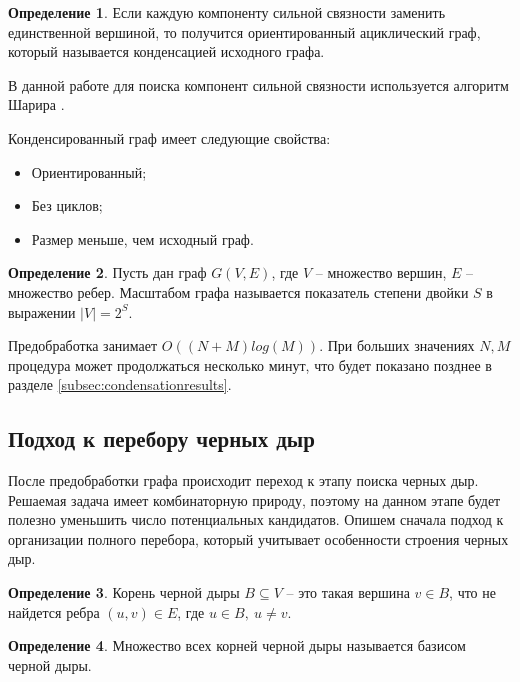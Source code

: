 \documentclass[12pt,a4paper,oneside,openany]{article}
\theoremstyle{definition}
\newtheorem{definition}{Определение}[]
\theoremstyle{lemma}
\theoremstyle{remark}
\begin{document}
\begin{definition}\label{def:condensation}
Если каждую компоненту сильной связности заменить единственной вершиной, то получится ориентированный ациклический граф, который называется конденсацией исходного графа.
\end{definition}

В данной работе для поиска компонент сильной связности используется алгоритм Шарира \cite{sharir1981strong}.

Конденсированный граф имеет следующие свойства:
    \begin{itemize}
        \item Ориентированный;
        \item Без циклов;
        \item Размер меньше, чем исходный граф.
    \end{itemize}

\begin{definition}
    Пусть дан граф $G(V,E)$, где $V$ -- множество вершин, $E$ -- множество ребер. Масштабом графа называется показатель степени двойки $S$ в выражении $|V| = 2^{S}$.
\end{definition}

Предобработка занимает $O((N+M)log(M))$. При больших значениях $N, M$ процедура может продолжаться несколько минут, что будет показано позднее
в разделе \ref{subsec:condensationresults}.

\subsection{Подход к перебору черных дыр}

После предобработки графа происходит переход к этапу поиска черных дыр.
Решаемая задача имеет комбинаторную природу,
поэтому на данном этапе будет полезно уменьшить число потенциальных кандидатов.
Опишем сначала подход к организации полного перебора, который учитывает особенности строения черных дыр.

\begin{definition}\label{def:blackholeroot}
Корень черной дыры $B \subseteq V$ -- это такая вершина $v \in B$, что не найдется ребра $(u, v) \in E$, где $u \in B,\ u \neq v$.
\end{definition}

\begin{definition}\label{def:blackholebasis}
Множество всех корней черной дыры называется базисом черной дыры.
\end{definition}
\end{document}
